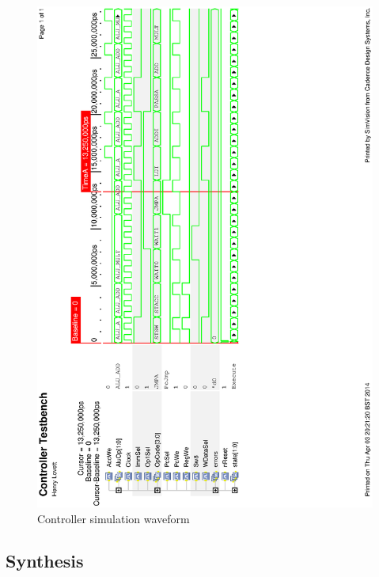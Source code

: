 \begin{figure}
\includegraphics[height=\textheight]{Figures/controllersim.eps}
\caption{Controller simulation waveform}
\label{fig:controllersim}
\end{figure}


\subsection{Synthesis}

